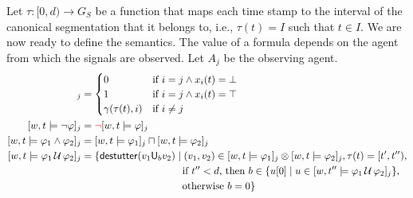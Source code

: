 Let $\tau : [0,d) \to G_S$ be a function that maps each time stamp to the interval of the canonical segmentation that it belongs to, i.e., $\tau(t) = I$ such that $t \in I$.
We are now ready to define the semantics.
The value of a formula depends on the agent from which the signals are observed.
Let $A_j$ be the observing agent.
\begin{align*}
	[w,t \models p_i]_j &= \begin{cases}
		0 &\text{if } i = j \land x_i(t) = \bot \\
		1 &\text{if } i = j \land x_i(t) = \top \\
	 	\gamma(\tau(t), i) &\text{if } i \neq j
	\end{cases} \\
	[w,t \models \lnot \varphi]_j &= \alert{\lnot} [w,t \models \varphi]_j \\
	[w,t \models \varphi_1 \land \varphi_2]_j &= [w,t \models \varphi_1]_j \sqcap [w,t \models \varphi_2]_j \\
	[w,t \models \varphi_1 \until \varphi_2]_j &= \{ \destutter(v_1 \mathsf{U}_{b} v_2) \st (v_1,v_2) \in [w,t \models \varphi_1]_j \otimes [w,t \models \varphi_2]_j, \tau(t) = [t',t''),\\ 
	&\hspace{10em} \text{if $t'' < d$, then } b \in \{ u[0] \st u \in [w,t'' \models \varphi_1 \until \varphi_2]_j \}, \\
	&\hspace{10em} \text{otherwise } b = 0 \} 
\end{align*} 


